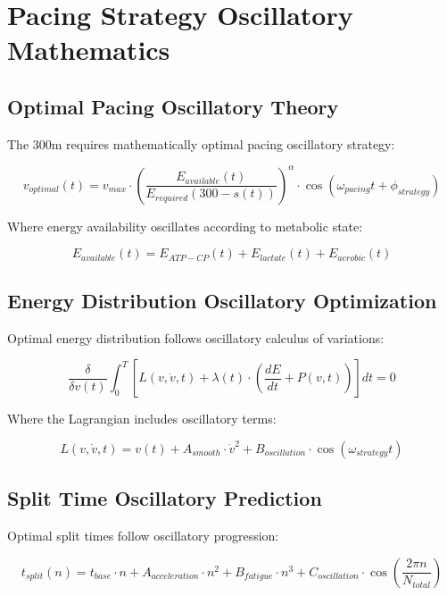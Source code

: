 \documentclass[12pt]{article}
\begin{document}
\section{Pacing Strategy Oscillatory Mathematics}

\subsection{Optimal Pacing Oscillatory Theory}

The 300m requires mathematically optimal pacing oscillatory strategy:

\begin{equation}
v_{optimal}(t) = v_{max} \cdot \left(\frac{E_{available}(t)}{E_{required}(300-s(t))}\right)^{\alpha} \cdot \cos(\omega_{pacing}t + \phi_{strategy})
\end{equation}

Where energy availability oscillates according to metabolic state:

\begin{equation}
E_{available}(t) = E_{ATP-CP}(t) + E_{lactate}(t) + E_{aerobic}(t)
\end{equation}

\subsection{Energy Distribution Oscillatory Optimization}

Optimal energy distribution follows oscillatory calculus of variations:

\begin{equation}
\frac{\delta}{\delta v(t)} \int_0^{T} \left[L(v, \dot{v}, t) + \lambda(t) \cdot \left(\frac{dE}{dt} + P(v,t)\right)\right] dt = 0
\end{equation}

Where the Lagrangian includes oscillatory terms:

\begin{equation}
L(v, \dot{v}, t) = v(t) + A_{smooth} \cdot \dot{v}^2 + B_{oscillation} \cdot \cos(\omega_{strategy}t)
\end{equation}

\subsection{Split Time Oscillatory Prediction}

Optimal split times follow oscillatory progression:

\begin{equation}
t_{split}(n) = t_{base} \cdot n + A_{acceleration} \cdot n^2 + B_{fatigue} \cdot n^3 + C_{oscillation} \cdot \cos\left(\frac{2\pi n}{N_{total}}\right)
\end{equation}
\end{document}
